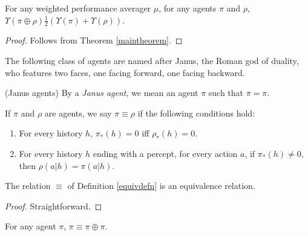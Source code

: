 \documentclass[runningheads]{llncs}
\begin{document}
\begin{theorem}
\label{averageperformancelemma}
    For any weighted performance averager $\mu$, for any agents
    $\pi$ and $\rho$, $\Upsilon(\pi\oplus\rho)\frac12(\Upsilon(\pi)+\Upsilon(\rho))$.
\end{theorem}

\begin{proof}
    Follows from Theorem \ref{maintheorem}.
\end{proof}

The following class of agents are named after Janus, the Roman god of duality,
who features two faces, one facing forward, one facing backward.

\begin{definition}
    (Janus agents)
    By a \emph{Janus agent}, we mean an agent $\pi$ such that
    $\overline{\pi}=\pi$.
\end{definition}

\begin{definition}
\label{equivdefn}
    If $\pi$ and $\rho$ are agents, we say $\pi\equiv\rho$ if the
    following conditions hold:
    \begin{enumerate}
        \item For every history $h$, $\pi_*(h)=0$ iff $\rho_*(h)=0$.
        \item For every history $h$ ending with a percept,
            for every action $a$, if $\pi_*(h)\not=0$,
            then $\rho(a|h)=\pi(a|h)$.
    \end{enumerate}
\end{definition}

\begin{lemma}
\label{equivrelationlemma}
    The relation $\equiv$ of Definition \ref{equivdefn} is an equivalence
    relation.
\end{lemma}

\begin{proof}
    Straightforward.
\end{proof}

\begin{lemma}
\label{piopluspilemma}
    For any agent $\pi$, $\pi\equiv\pi\oplus\pi$.
\end{lemma}
\end{document}
